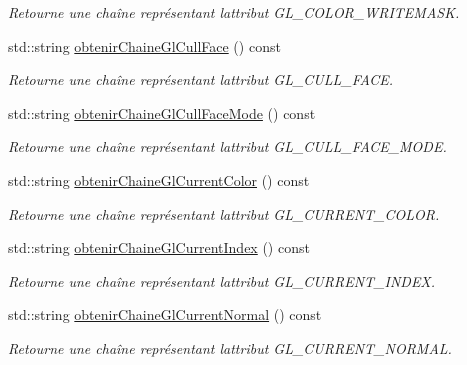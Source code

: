 \begin{DoxyCompactItemize}
\begin{DoxyCompactList}\small\item\em Retourne une chaîne représentant l\textquotesingle{}attribut G\+L\+\_\+\+C\+O\+L\+O\+R\+\_\+\+W\+R\+I\+T\+E\+M\+A\+S\+K. \end{DoxyCompactList}\item 
std\+::string \hyperlink{group__utilitaire_ga6c53044cfb9b67582efe6415ff1f1f49}{obtenir\+Chaine\+Gl\+Cull\+Face} () const 
\begin{DoxyCompactList}\small\item\em Retourne une chaîne représentant l\textquotesingle{}attribut G\+L\+\_\+\+C\+U\+L\+L\+\_\+\+F\+A\+C\+E. \end{DoxyCompactList}\item 
std\+::string \hyperlink{group__utilitaire_ga0601a9f84791de8e9ab33841308ecea0}{obtenir\+Chaine\+Gl\+Cull\+Face\+Mode} () const 
\begin{DoxyCompactList}\small\item\em Retourne une chaîne représentant l\textquotesingle{}attribut G\+L\+\_\+\+C\+U\+L\+L\+\_\+\+F\+A\+C\+E\+\_\+\+M\+O\+D\+E. \end{DoxyCompactList}\item 
std\+::string \hyperlink{group__utilitaire_gabe349174d65850291bc46f7b524dac44}{obtenir\+Chaine\+Gl\+Current\+Color} () const 
\begin{DoxyCompactList}\small\item\em Retourne une chaîne représentant l\textquotesingle{}attribut G\+L\+\_\+\+C\+U\+R\+R\+E\+N\+T\+\_\+\+C\+O\+L\+O\+R. \end{DoxyCompactList}\item 
std\+::string \hyperlink{group__utilitaire_ga222790a07e4a9cacfbe2f68cd97fd8d9}{obtenir\+Chaine\+Gl\+Current\+Index} () const 
\begin{DoxyCompactList}\small\item\em Retourne une chaîne représentant l\textquotesingle{}attribut G\+L\+\_\+\+C\+U\+R\+R\+E\+N\+T\+\_\+\+I\+N\+D\+E\+X. \end{DoxyCompactList}\item 
std\+::string \hyperlink{group__utilitaire_gac6c54789d936998634ad29c80e150d92}{obtenir\+Chaine\+Gl\+Current\+Normal} () const 
\begin{DoxyCompactList}\small\item\em Retourne une chaîne représentant l\textquotesingle{}attribut G\+L\+\_\+\+C\+U\+R\+R\+E\+N\+T\+\_\+\+N\+O\+R\+M\+A\+L. \end{DoxyCompactList}\item 

\end{DoxyCompactItemize}
